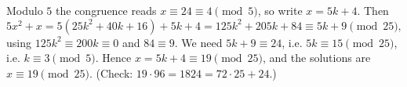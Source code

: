 Modulo $5$ the congruence reads $x\equiv24\equiv4\pmod5$, so write $x=5k+4$. Then
\[5x^2+x=5\left(25k^2+40k+16\right)+5k+4=125k^2+205k+84\equiv5k+9\pmod{25},\]
using $125k^2\equiv200k\equiv0$ and $84\equiv9$. We need $5k+9\equiv24$, i.e. $5k\equiv15\pmod{25}$, i.e. $k\equiv3\pmod5$. Hence $x=5k+4\equiv19\pmod{25}$, and the solutions are $\boxed{x\equiv19\pmod{25}}$. (Check: $19\cdot96=1824=72\cdot25+24$.)
